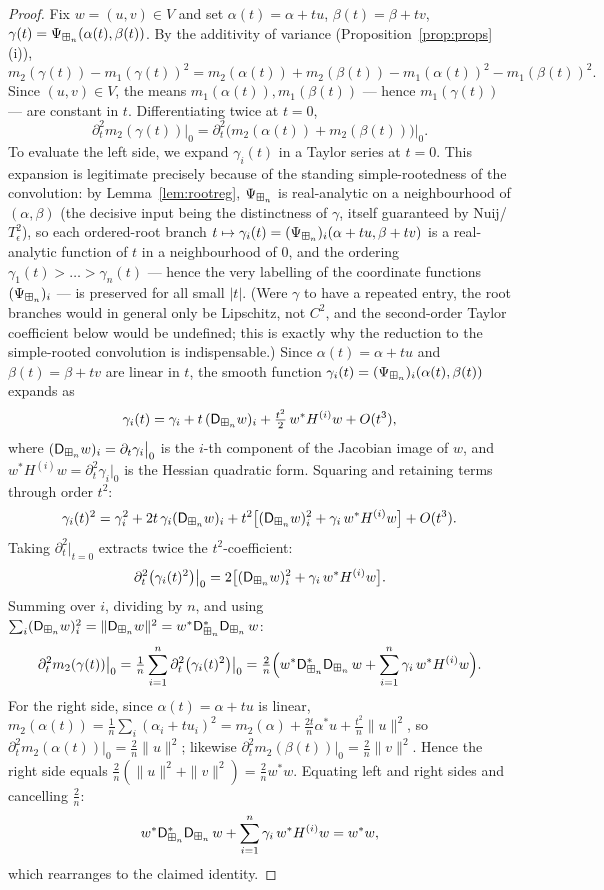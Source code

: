 \begin{proof}
Fix $w=(u,v)\in V$ and set $\alpha(t)=\alpha+tu$, $\beta(t)=\beta+tv$,
$\gamma(t)=\Psi_{\boxplus_n}(\alpha(t),\beta(t))$. By the additivity of variance
(Proposition~\ref{prop:props}(i)),
\[
m_2(\gamma(t))-m_1(\gamma(t))^2
=m_2(\alpha(t))+m_2(\beta(t))-m_1(\alpha(t))^2-m_1(\beta(t))^2 .
\]
Since $(u,v)\in V$, the means $m_1(\alpha(t)),m_1(\beta(t))$ — hence
$m_1(\gamma(t))$ — are constant in $t$. Differentiating twice at $t=0$,
\[
\partial_t^2 m_2(\gamma(t))\big|_0=\partial_t^2\bigl(m_2(\alpha(t))+m_2(\beta(t))\bigr)\big|_0 .
\]
To evaluate the left side, we expand $\gamma_i(t)$ in a Taylor series at $t=0$.
This expansion is legitimate precisely because of the standing simple-rootedness
of the convolution: by Lemma~\ref{lem:rootreg}, $\Psi_{\boxplus_n}$ is real-analytic
on a neighbourhood of $(\alpha,\beta)$ (the decisive input being the distinctness
of $\gamma$, itself guaranteed by Nuij/$T_\epsilon^2$), so each ordered-root
branch $t\mapsto\gamma_i(t)=(\Psi_{\boxplus_n})_i(\alpha+tu,\beta+tv)$ is a real-analytic
function of $t$ in a neighbourhood of $0$, and the ordering
$\gamma_1(t)>\dots>\gamma_n(t)$ — hence the very labelling of the coordinate
functions $(\Psi_{\boxplus_n})_i$ — is preserved for all small $|t|$. (Were $\gamma$
to have a repeated entry, the root branches would in general only be Lipschitz,
not $C^2$, and the second-order Taylor coefficient below would be undefined; this
is exactly why the reduction to the simple-rooted convolution is indispensable.)
Since $\alpha(t)=\alpha+tu$ and $\beta(t)=\beta+tv$ are linear in $t$, the smooth
function $\gamma_i(t)=(\Psi_{\boxplus_n})_i(\alpha(t),\beta(t))$ expands as
\[
\gamma_i(t) = \gamma_i + t\,(\mathsf{D}_{\boxplus_n} w)_i + \tfrac{t^2}{2}\,w^\ast H^{(i)}w + O(t^3),
\]
where $(\mathsf{D}_{\boxplus_n} w)_i = \partial_t\gamma_i\big|_0$ is the $i$-th component of the
Jacobian image of $w$, and $w^\ast H^{(i)}w = \partial_t^2\gamma_i\big|_0$ is the
Hessian quadratic form. Squaring and retaining terms through order $t^2$:
\[
\gamma_i(t)^2 = \gamma_i^2 + 2t\,\gamma_i(\mathsf{D}_{\boxplus_n} w)_i
  + t^2\bigl[(\mathsf{D}_{\boxplus_n} w)_i^2 + \gamma_i\,w^\ast H^{(i)}w\bigr] + O(t^3).
\]
Taking $\partial_t^2\big|_{t=0}$ extracts twice the $t^2$-coefficient:
\[
\partial_t^2\bigl(\gamma_i(t)^2\bigr)\big|_0
  = 2\bigl[(\mathsf{D}_{\boxplus_n} w)_i^2 + \gamma_i\,w^\ast H^{(i)}w\bigr].
\]
Summing over $i$, dividing by $n$, and using $\sum_i(\mathsf{D}_{\boxplus_n} w)_i^2
=\|\mathsf{D}_{\boxplus_n} w\|^2=w^\ast\mathsf{D}_{\boxplus_n}^\ast\mathsf{D}_{\boxplus_n}\,w$:
\[
\partial_t^2 m_2(\gamma(t))\big|_0
  = \tfrac{1}{n}\sum_{i=1}^n \partial_t^2\bigl(\gamma_i(t)^2\bigr)\big|_0
  = \tfrac{2}{n}\Bigl(w^\ast\mathsf{D}_{\boxplus_n}^\ast\mathsf{D}_{\boxplus_n}\,w
    + \sum_{i=1}^n\gamma_i\,w^\ast H^{(i)}w\Bigr).
\]
For the right side, since $\alpha(t)=\alpha+tu$ is linear,
$m_2(\alpha(t))=\tfrac1n\sum_i(\alpha_i+tu_i)^2
=m_2(\alpha)+\tfrac{2t}{n}\alpha^\ast u+\tfrac{t^2}{n}\|u\|^2$,
so $\partial_t^2 m_2(\alpha(t))\big|_0=\tfrac{2}{n}\|u\|^2$;
likewise $\partial_t^2 m_2(\beta(t))\big|_0=\tfrac{2}{n}\|v\|^2$.
Hence the right side equals $\tfrac{2}{n}(\|u\|^2+\|v\|^2)=\tfrac{2}{n}w^\ast w$.
Equating left and right sides and cancelling $\tfrac{2}{n}$:
\[
w^\ast\mathsf{D}_{\boxplus_n}^\ast\mathsf{D}_{\boxplus_n}\,w + \sum_{i=1}^n\gamma_i\,w^\ast H^{(i)}w = w^\ast w,
\]
which rearranges to the claimed identity.
\end{proof}

